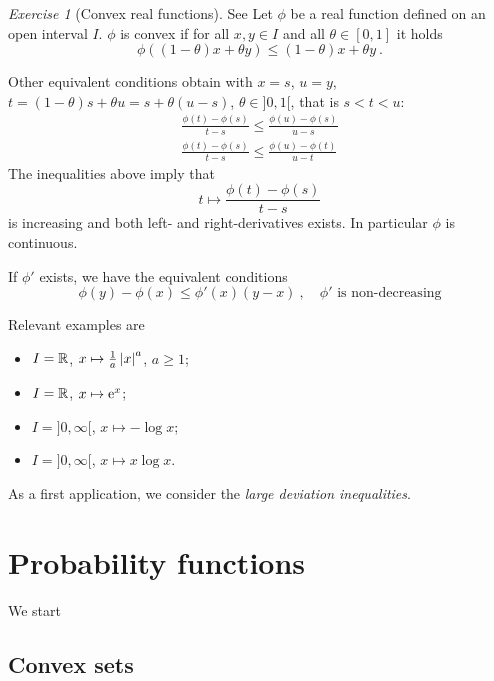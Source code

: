 \documentclass[12pt,a4paper]{amsart}
\theoremstyle{plain}%
\theoremstyle{definition}
\theoremstyle{remark}
\newtheorem{exercise}{Exercise}
\begin{document}
\begin{exercise}[Convex real functions] See
  \cite[p.~61--65]{rudin:1987-3rd}
Let $\phi$ be a real function defined on an open interval $I$. $\phi$ is
convex if for all $x,y \in I$ and all $\theta \in [0,1]$ it holds
\begin{equation*}
  \phi((1-\theta)x + \theta y) \leq (1-\theta)x + \theta y \ .
\end{equation*}

Other equivalent conditions obtain with $x=s$,
$u=y$, $t = (1-\theta)s + \theta u = s + \theta (u-s)$, $\theta \in
]0,1[$, that is $s
< t < u$: 
\begin{gather*}
  \frac{\phi(t)-\phi(s)}{t-s} \leq \frac{\phi(u)-\phi(s)}{u-s}  \\
    \frac{\phi(t)-\phi(s)}{t-s} \leq \frac{\phi(u)-\phi(t)}{u-t} 
\end{gather*}
The inequalities above imply that
\begin{equation*}
  t \mapsto \frac{\phi(t)-\phi(s)}{t-s}
\end{equation*}
is increasing and both left- and right-derivatives exists. In
particular $\phi$ is continuous.

If $\phi'$ exists, we have the equivalent conditions
\begin{equation*}
  \phi(y) - \phi(x) \leq \phi'(x)(y-x) \ , \quad \text{$\phi'$ is non-decreasing}
\end{equation*}

Relevant examples are
\begin{itemize}
\item  $I = \mathbb{R}$, $x \mapsto \frac1a \left\vert x\right\vert ^ a$, $a \geq 1$;
  \item
  $I = \mathbb{R}$, $x \mapsto \mathrm{e}^x$;
\item $I = ]0,\infty[$, $x \mapsto - \log x$;
\item $I = ]0,\infty[$, $x \mapsto x \log x$.
\end{itemize}

As a first application, we consider the \emph{large deviation inequalities}.

\end{exercise}

\section{Probability functions} We start 

\subsection{Convex sets}
\label{sec:aside:-convex-set}
\end{document}
